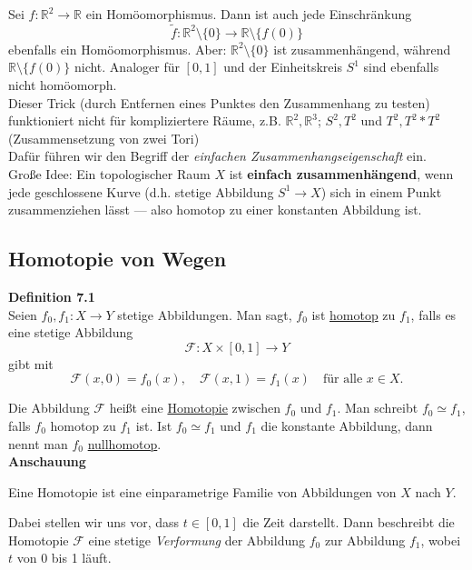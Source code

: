 \documentclass[fleqn, 12pt, letterpaper]{article}
\begin{document}
Sei \( f: \mathbb{R}^2 \to \mathbb{R} \) ein Homöomorphismus. Dann ist auch jede Einschränkung
\[
\tilde{f} : \mathbb{R}^2 \setminus \{0\} \to \mathbb{R} \setminus \{f(0)\}
\]
ebenfalls ein Homöomorphismus. Aber: \( \mathbb{R}^2 \setminus \{0\} \) ist zusammenhängend, während \( \mathbb{R} \setminus \{f(0)\} \) nicht. {Analoger für} \( [0,1] \) und der Einheitskreis \( S^1 \) sind ebenfalls nicht homöomorph.\\

Dieser Trick (durch Entfernen eines Punktes den Zusammenhang zu testen) funktioniert nicht für kompliziertere Räume, z.B. $\mathbb{R}^2, \mathbb{R}^3$; $S^2, T^2$ und $T^2, T^2*T^2$ (Zusammensetzung von zwei Tori)\\

{Dafür führen wir den Begriff der \emph{einfachen Zusammenhangseigenschaft} ein.}\\

{Große Idee:} Ein topologischer Raum \( X \) ist \textbf{einfach zusammenhängend}, wenn jede geschlossene Kurve (d.h. stetige Abbildung \( S^1 \to X \)) sich in einem Punkt zusammenziehen lässt — also homotop zu einer konstanten Abbildung ist.

\subsection{Homotopie von Wegen}

\textbf{Definition 7.1} \\
Seien \( f_0, f_1 : X \to Y \) stetige Abbildungen. Man sagt, \( f_0 \) ist \underline{homotop} zu \( f_1 \), falls es eine stetige Abbildung
\[
\mathcal{F} : X \times [0,1] \to Y
\]
gibt mit
\[
\mathcal{F}(x,0) = f_0(x), \quad \mathcal{F}(x,1) = f_1(x)
\quad \text{für alle } x \in X.
\]

Die Abbildung \( \mathcal{F} \) heißt eine \underline{Homotopie} zwischen \( f_0 \) und \( f_1 \). Man schreibt \( f_0 \simeq f_1 \), falls \( f_0 \) homotop zu \( f_1 \) ist. Ist \( f_0 \simeq f_1 \) und \( f_1 \) die konstante Abbildung, dann nennt man \( f_0 \) \underline{nullhomotop}.\\

\textbf{Anschauung}

Eine Homotopie ist eine einparametrige Familie von Abbildungen von \( X \) nach \( Y \).

Dabei stellen wir uns vor, dass \( t \in [0,1] \) die Zeit darstellt. Dann beschreibt die Homotopie \( \mathcal{F} \) eine stetige \emph{Verformung} der Abbildung \( f_0 \) zur Abbildung \( f_1 \), wobei \( t \) von 0 bis 1 läuft.
\end{document}
